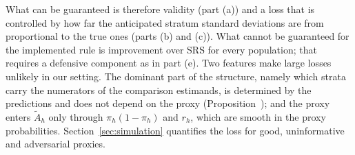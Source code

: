 What can be guaranteed is therefore validity (part (a)) and a loss that is controlled by how far
the anticipated stratum standard deviations are from proportional to the true ones (parts (b) and
(c)). What cannot be guaranteed for the implemented rule is improvement over SRS for every
population; that requires a defensive component as in part (e). Two features make large losses
unlikely in our setting. The dominant part of the structure, namely which strata carry the
numerators of the comparison estimands, is determined by the predictions and does not depend on the
proxy (Proposition~); and the proxy enters $\tilde A_h$ only through
$\pi_h(1-\pi_h)$ and $r_h$, which are smooth in the proxy probabilities. Section~\ref{sec:simulation}
quantifies the loss for good, uninformative and adversarial proxies.